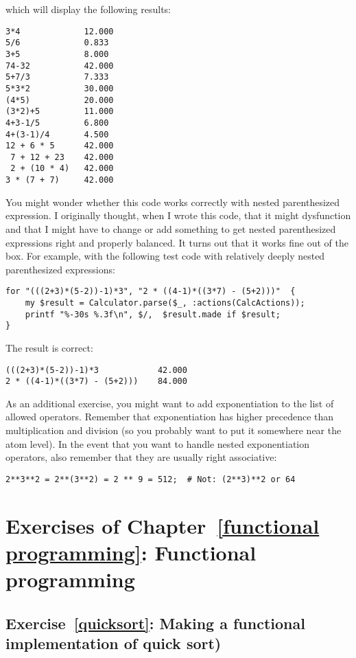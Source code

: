 which will display the following results:

\begin{verbatim}
3*4             12.000
5/6             0.833
3+5             8.000
74-32           42.000
5+7/3           7.333
5*3*2           30.000
(4*5)           20.000
(3*2)+5         11.000
4+3-1/5         6.800
4+(3-1)/4       4.500
12 + 6 * 5      42.000
 7 + 12 + 23    42.000
 2 + (10 * 4)   42.000
3 * (7 + 7)     42.000
\end{verbatim}

You might wonder whether this code works correctly with nested 
parenthesized expression. I originally thought, when I wrote this 
code, that it might dysfunction and that I might have to change 
or add something to get nested parenthesized expressions right and 
properly balanced. It turns out that it works fine out of the 
box. For example, with the following test code with relatively 
deeply nested parenthesized expressions:

\begin{verbatim}
for "(((2+3)*(5-2))-1)*3", "2 * ((4-1)*((3*7) - (5+2)))"  { 
    my $result = Calculator.parse($_, :actions(CalcActions));
    printf "%-30s %.3f\n", $/,  $result.made if $result;
}
\end{verbatim}

The result is correct:
\begin{verbatim}
(((2+3)*(5-2))-1)*3            42.000
2 * ((4-1)*((3*7) - (5+2)))    84.000
\end{verbatim}

As an additional exercise, you might want to add exponentiation 
to the list of allowed operators. Remember that exponentiation has 
higher precedence than multiplication and division (so you probably 
want to put it somewhere near the atom level). In the event that 
you want to handle nested exponentiation operators, also 
remember that they are usually right associative:

\begin{verbatim}
2**3**2 = 2**(3**2) = 2 ** 9 = 512;  # Not: (2**3)**2 or 64
\end{verbatim}

\section{Exercises of Chapter~\ref{functional programming}: Functional programming}

\subsection{Exercise~\ref{quicksort}: Making a functional implementation of quick sort)}
\label{sol_quicksort}

